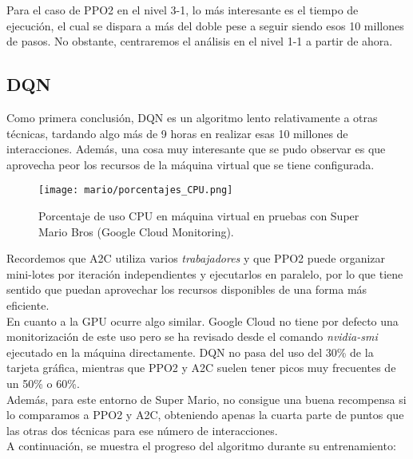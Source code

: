 \documentclass[11pt,fleqn]{book} %
\begin{document}
Para el caso de PPO2 en el nivel 3-1, lo más interesante es el tiempo de ejecución, el cual se dispara a más del doble pese a seguir siendo esos 10 millones de pasos. No obstante, centraremos el análisis en el nivel 1-1 a partir de ahora. 

\subsection{DQN}

Como primera conclusión, DQN es un algoritmo lento relativamente a otras técnicas, tardando algo más de 9 horas en realizar esas 10 millones de interacciones. Además, una cosa muy interesante que se pudo observar es que aprovecha peor los recursos de la máquina virtual que se tiene configurada.

\newpage

\begin{figure}[H]
	\centering\texttt{[image: mario/porcentajes\_CPU.png]}
	\caption{Porcentaje de uso CPU en máquina virtual en pruebas con Super Mario Bros (Google Cloud Monitoring).}
	\label{fig:usoCPU} %
\end{figure}

Recordemos que A2C utiliza varios \textit{trabajadores} y que PPO2 puede organizar mini-lotes por iteración independientes y ejecutarlos en paralelo, por lo que tiene sentido que puedan aprovechar los recursos disponibles de una forma más eficiente. \\

En cuanto a la GPU ocurre algo similar. Google Cloud no tiene por defecto una monitorización de este uso pero se ha revisado desde el comando \textit{nvidia-smi} ejecutado en la máquina directamente. DQN no pasa del uso del 30\% de la tarjeta gráfica, mientras que PPO2 y A2C suelen tener picos muy frecuentes de un 50\% o 60\%. \\

Además, para este entorno de Super Mario, no consigue una buena recompensa si lo comparamos a PPO2 y A2C, obteniendo apenas la cuarta parte de puntos que las otras dos técnicas para ese número de interacciones. \\

A continuación, se muestra el progreso del algoritmo durante su entrenamiento:

\newpage
\end{document}
